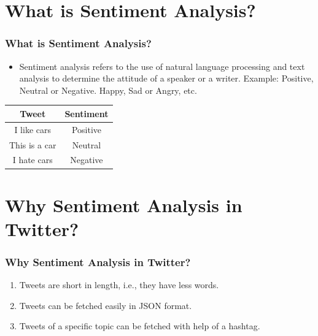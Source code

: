 \documentclass[12pt,xcolor=dvipsnames,table,titlepage]{beamer}
\begin{document}
\section{What is Sentiment Analysis?}
\begin{frame}[t]
\frametitle{What is Sentiment Analysis?} %
\begin{itemize}
 \item Sentiment analysis refers to the use of natural language processing and text analysis to determine the attitude of a speaker or a writer. Example: Positive, Neutral or Negative. Happy, Sad or Angry, etc.
\end{itemize}
\begin{table}[h]
\begin{tabular}{|c|c|}
\hline
\textbf{Tweet} & \textbf{Sentiment} \\ \hline
I like cars    & Positive           \\ \hline
This is a car  & Neutral            \\ \hline
I hate cars    & Negative           \\ \hline
\end{tabular}
\end{table}

\end{frame}

\section{Why Sentiment Analysis in Twitter?}
\begin{frame}[t]
\frametitle{Why Sentiment Analysis in Twitter? \cite{rp2} \cite{rp4}}
\begin{enumerate}
 \item Tweets are short in length, i.e., they have less words.
 \item Tweets can be fetched easily in JSON format.
 \item Tweets of a specific topic can be fetched with help of a hashtag.
\end{enumerate}
\end{frame}
\end{document}
